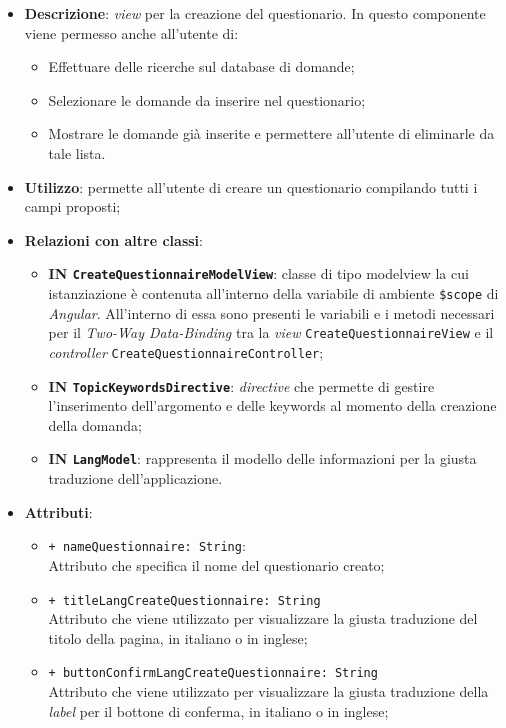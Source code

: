 \begin{itemize}
	\item \textbf{Descrizione}: \textit{view} per la creazione del questionario. In questo componente viene permesso anche all'utente di:
	\begin{itemize}
		\item Effettuare delle ricerche sul database di domande;
		\item Selezionare le domande da inserire nel questionario;
		\item Mostrare le domande già inserite e permettere all'utente di eliminarle da tale lista.
	\end{itemize}
	\item \textbf{Utilizzo}: permette all'utente di creare un questionario compilando tutti i campi proposti;
	\item \textbf{Relazioni con altre classi}:
	\begin{itemize}
		\item \textbf{IN \texttt{CreateQuestionnaireModelView}}: classe di tipo modelview la cui istanziazione è contenuta all'interno della variabile di ambiente \texttt{\$scope} di \textit{Angular}. All'interno di essa sono presenti le variabili e i metodi necessari per il \textit{Two-Way Data-Binding} tra la \textit{view} \texttt{CreateQuestionnaireView} e il \textit{controller} \texttt{CreateQuestionnaireController};
		\item \textbf{IN \texttt{TopicKeywordsDirective}}: \textit{directive} che permette di gestire l'inserimento dell'argomento e delle keywords al momento della creazione della domanda;
		\item \textbf{IN \texttt{LangModel}}: rappresenta il modello delle informazioni per la giusta traduzione dell'applicazione.
	\end{itemize}
		\item \textbf{Attributi}:
		\begin{itemize}
			\item \texttt{+ nameQuestionnaire: String}: \\ Attributo che specifica il nome del questionario creato;
			\item \texttt{+ titleLangCreateQuestionnaire: String} \\ Attributo che viene utilizzato per visualizzare la giusta traduzione del titolo della pagina, in italiano o in inglese;
			\item \texttt{+ buttonConfirmLangCreateQuestionnaire: String} \\ Attributo che viene utilizzato per visualizzare la giusta traduzione della \textit{label} per il bottone di conferma, in italiano o in inglese;

\end{itemize}
\end{itemize}
